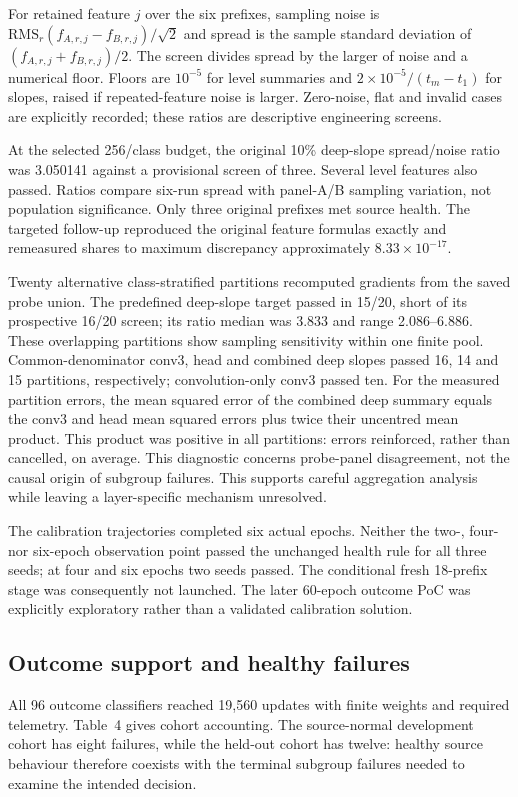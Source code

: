 For retained feature $j$ over the six prefixes, sampling noise is $\mathrm{RMS}_r(f_{A,r,j}-f_{B,r,j})/\sqrt{2}$ and spread is the sample standard deviation of $(f_{A,r,j}+f_{B,r,j})/2$. The screen divides spread by the larger of noise and a numerical floor. Floors are $10^{-5}$ for level summaries and $2\times10^{-5}/(t_m-t_1)$ for slopes, raised if repeated-feature noise is larger. Zero-noise, flat and invalid cases are explicitly recorded; these ratios are descriptive engineering screens.

At the selected 256/class budget, the original 10\% deep-slope spread/noise ratio was 3.050141 against a provisional screen of three. Several level features also passed. Ratios compare six-run spread with panel-A/B sampling variation, not population significance. Only three original prefixes met source health. The targeted follow-up reproduced the original feature formulas exactly and remeasured shares to maximum discrepancy approximately $8.33\times10^{-17}$.

Twenty alternative class-stratified partitions recomputed gradients from the saved probe union. The predefined deep-slope target passed in 15/20, short of its prospective 16/20 screen; its ratio median was 3.833 and range 2.086--6.886. These overlapping partitions show sampling sensitivity within one finite pool. Common-denominator conv3, head and combined deep slopes passed 16, 14 and 15 partitions, respectively; convolution-only conv3 passed ten. For the measured partition errors, the mean squared error of the combined deep summary equals the conv3 and head mean squared errors plus twice their uncentred mean product. This product was positive in all partitions: errors reinforced, rather than cancelled, on average. This diagnostic concerns probe-panel disagreement, not the causal origin of subgroup failures. This supports careful aggregation analysis while leaving a layer-specific mechanism unresolved.

The calibration trajectories completed six actual epochs. Neither the two-, four- nor six-epoch observation point passed the unchanged health rule for all three seeds; at four and six epochs two seeds passed. The conditional fresh 18-prefix stage was consequently not launched. The later 60-epoch outcome PoC was explicitly exploratory rather than a validated calibration solution.

\subsection{Outcome support and healthy failures}
All 96 outcome classifiers reached 19,560 updates with finite weights and required telemetry. Table~4 gives cohort accounting. The source-normal development cohort has eight failures, while the held-out cohort has twelve: healthy source behaviour therefore coexists with the terminal subgroup failures needed to examine the intended decision.

